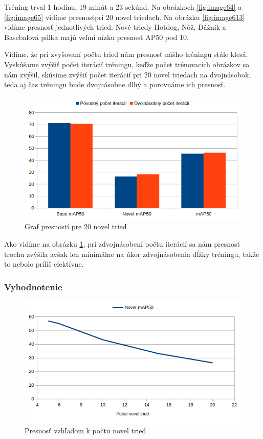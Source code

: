 Tréning trval 1 hodinu, 19 minút a 23 sekúnd. Na obrázkoch \ref{fig:image64} a \ref{fig:image65} vidíme presnosťpri 20 novel triedach. Na obrázku \ref{fig:image613} vidíme presnosť jednotlivých tried. Nové triedy Hotdog, Nôž, Dážnik a Basebalová pálka majú veľmi nízku presnosť AP50 pod 10.

Vidíme, že pri zvyšovaní počtu tried nám presnosť nášho tréningu stále klesá. Vyskúšame zvýšiť počet iterácií tréningu, keďže počet trénovacích obrázkov sa nám zvýšil, skúsime zvýšiť počet iterácií pri 20 novel triedach na dvojnásobok, teda aj čas tréningu bude dvojnásobne dlhý a porovnáme ich presnosť. 

\begin{figure}[H]
\centering
\includegraphics[width=\textwidth]{images/compare_20novel.png}
\caption{Graf presností pre 20 novel tried}
\label{fig:image66}
\end{figure}

Ako vidíme na obrázku \ref{fig:image66}, pri zdvojnásobení počtu iterácií sa nám presnosť trochu zvýšila avšak len minimálne na úkor zdvojnásobenia dĺžky tréningu, takže to nebolo príliš efektívne.  

\subsubsection{Vyhodnotenie}

\begin{figure}[H]
\centering
\includegraphics[width=\textwidth]{images/more_novel_results.png}
\caption{Presnosť vzhľadom k počtu novel tried}
\label{fig:image67}
\end{figure}

